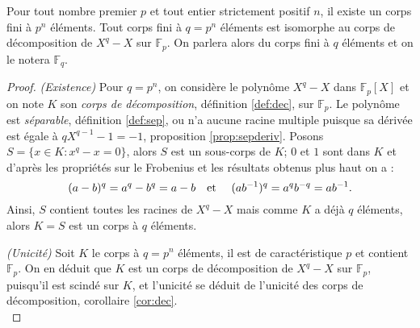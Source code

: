 \documentclass[a4paper]{article} %
\numberwithin{section}{part}
\numberwithin{equation}{section}
\newcommand\GF[1]{\mathbb{F}_{#1}}
\newcommand\etmath{\textup{\quad et \quad}}
\begin{document}
\begin{thm}
\label{th:isomGF}
Pour tout nombre premier $p$ et tout entier strictement positif $n$, il existe 
un corps fini à $p^n$ éléments. Tout corps fini à $q = p^n$ éléments est 
isomorphe au corps de décomposition de $X^q - X$ sur $\GF{p}$. On parlera 
alors du corps fini à $q$ éléments et on le notera $\GF{q}$.
\end{thm}
\begin{proof}
\textit{(Existence)} Pour $q = p^n$, on considère le polynôme $X^q - X$ dans 
$\GF{p}[X]$ et on note $K$ son \emph{corps de décomposition}, définition 
\ref{def:dec}, sur $\GF{p}$. Le polynôme est \emph{séparable}, définition 
\ref{def:sep}, ou n'a aucune racine multiple puisque sa dérivée est égale à 
$qX^{q-1} - 1 = -1$, proposition \ref{prop:sepderiv}. Posons $S=\lbrace x\in K 
: x^q - x = 0\rbrace$, alors $S$ est un sous-corps de $K$; $0$ et $1$ sont 
dans $K$ et d'après les propriétés sur le Frobenius et les résultats obtenus 
plus haut on a :
\begin{equation}
(a - b)^q = a^q - b^q = a - b \etmath(ab^{-1})^q = a^qb^{-q} = ab^{-1}.
\end{equation}
Ainsi, $S$ contient toutes les racines de $X^q - X$ mais comme $K$ a déjà $q$
éléments, alors $K = S$ est un corps à $q$ éléments.\par
\textit{(Unicité)} Soit $K$ le corps à $q = p^n$ éléments, il est de 
caractéristique $p$ et contient $\GF{p}$. On en déduit que $K$ est un corps de 
décomposition de $X^q - X$ sur $\GF{p}$, puisqu'il est scindé sur $K$, et 
l'unicité se déduit de l'unicité des corps de décomposition, corollaire 
\ref{cor:dec}.\\
\end{proof}
\end{document}
